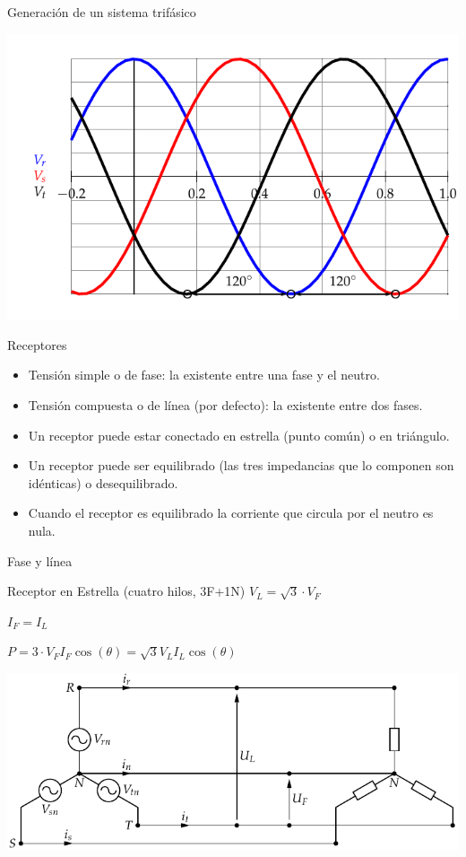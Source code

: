 \documentclass[xcolor={usenames,svgnames,dvipsnames}]{beamer}
\begin{document}
\begin{frame}[label={sec:orgd6594c9}]{Generación de un sistema trifásico}
\begin{center}
\includegraphics[width=.9\linewidth]{../figs/TensionesTrifasica.pdf}
\end{center}
\end{frame}

\begin{frame}[label={sec:org798b9e3}]{Receptores}
\begin{itemize}
\item \alert{Tensión simple o de fase}: la existente entre una fase y el neutro.
\item \alert{Tensión compuesta o de línea} (por defecto): la existente entre dos fases.
\item Un receptor puede estar conectado en \alert{estrella} (punto común) o en \alert{triángulo}.
\item Un receptor puede ser \alert{equilibrado} (las tres impedancias que lo componen son idénticas) o \alert{desequilibrado}.
\item Cuando el receptor es equilibrado la corriente que circula por el neutro es nula.
\end{itemize}
\end{frame}

\begin{frame}[label={sec:org150d2da}]{Fase y línea}
\begin{block}{Receptor en Estrella (cuatro hilos, 3F+1N)}
\(V_{L}=\sqrt{3}\cdot V_{F}\) 

\(I_{F}=I_{L}\)

\(P=3\cdot V_{F}I_{F}\cos(\theta)=\sqrt{3}V_{L}I_{L}\cos(\theta)\)
\begin{center}
\includegraphics[width=.9\linewidth]{../figs/RedTrifasicaEstrella.pdf}
\end{center}
\end{block}
\end{frame}
\end{document}
